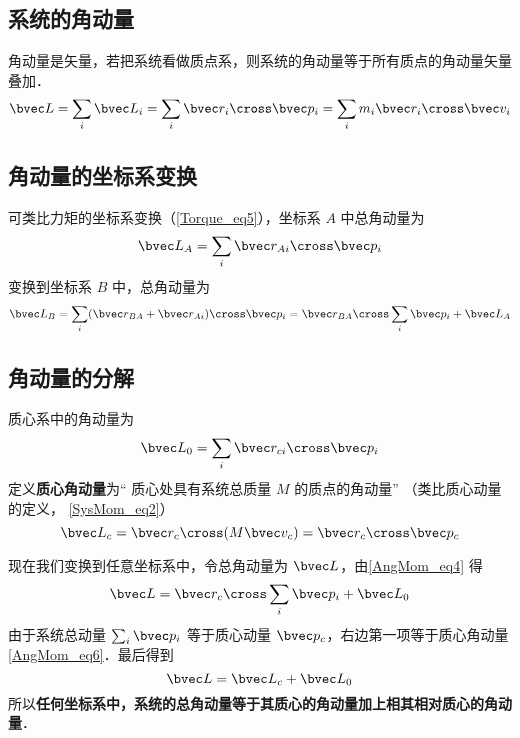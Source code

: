 

\subsection{系统的角动量}
角动量是矢量，若把系统看做质点系，则系统的角动量等于所有质点的角动量矢量叠加．
\begin{equation}\label{AngMom_eq1}
\bvec L = \sum_i \bvec L_i = \sum_i \bvec r_i \cross\bvec p_i = \sum_i m_i \bvec r_i \cross\bvec v_i
\end{equation}

\subsection{角动量的坐标系变换}
可类比力矩的坐标系变换（\autoref{Torque_eq5}），坐标系 $A$ 中总角动量为
\begin{equation}
\bvec L_A = \sum_i \bvec r_{Ai} \cross \bvec p_i 
\end{equation}
变换到坐标系 $B$ 中，总角动量为
\begin{equation}\label{AngMom_eq4}
\bvec L_B = \sum_i (\bvec r_{BA} + \bvec r_{Ai})\cross \bvec p_i = \bvec r_{BA}\cross \sum_i \bvec p_i + \bvec L_A
\end{equation}

\subsection{角动量的分解}
质心系中的角动量为
\begin{equation}\label{AngMom_eq5}
\bvec L_0 = \sum_i \bvec r_{ci} \cross \bvec p_i
\end{equation}
定义\textbf{质心角动量}为“ 质心处具有系统总质量 $M$ 的质点的角动量” （类比质心动量的定义， \autoref{SysMom_eq2}）
\begin{equation}\label{AngMom_eq6}
\bvec L_c  = \bvec r_c \cross (M \bvec v_c) = \bvec r_c \cross \bvec p_c
\end{equation}

现在我们变换到任意坐标系中，令总角动量为 $\bvec L$，由\autoref{AngMom_eq4} 得
\begin{equation}
\bvec L = \bvec r_{c} \cross \sum_i \bvec p_i + \bvec L_0
\end{equation}
由于系统总动量 $\sum_i \bvec p_i$ 等于质心动量 $\bvec p_c$，右边第一项等于质心角动量\autoref{AngMom_eq6}．最后得到
\begin{equation}
\bvec L = \bvec L_c + \bvec L_0
\end{equation}
所以\textbf{任何坐标系中，系统的总角动量等于其质心的角动量加上相其相对质心的角动量}．
